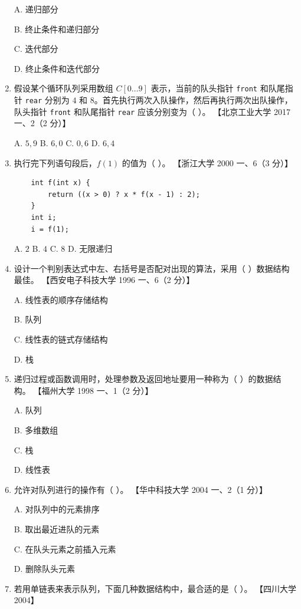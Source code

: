 \documentclass[lang=cn,newtx,10pt,scheme=chinese]{elegantbook}
\begin{document}
\begin{enumerate}
    A. 递归部分  

    B. 终止条件和递归部分  

    C. 迭代部分  

    D. 终止条件和迭代部分  

    \item 假设某个循环队列采用数组 $C[0 \ldots 9]$ 表示，当前的队头指针 \texttt{front} 和队尾指针 \texttt{rear} 分别为 $4$ 和 $8$。首先执行两次入队操作，然后再执行两次出队操作，队头指针 \texttt{front} 和队尾指针 \texttt{rear} 应该分别变为（ ）。  
    【北京工业大学 2017 一、2（2 分）】  

    A. $5, 9$ \quad B. $6, 0$ \quad C. $0, 6$ \quad D. $6, 4$  

    \item 执行完下列语句段后，$f(1)$ 的值为（ ）。  
    【浙江大学 2000 一、6（3 分）】  

    \begin{verbatim}
    int f(int x) {
        return ((x > 0) ? x * f(x - 1) : 2);
    }
    int i;
    i = f(1);
    \end{verbatim}

    A. $2$ \quad B. $4$ \quad C. $8$ \quad D. 无限递归  

    \item 设计一个判别表达式中左、右括号是否配对出现的算法，采用（ ）数据结构最佳。  
    【西安电子科技大学 1996 一、6（2 分）】  

    A. 线性表的顺序存储结构  

    B. 队列  


    C. 线性表的链式存储结构  

    D. 栈  

    \item 递归过程或函数调用时，处理参数及返回地址要用一种称为（ ）的数据结构。  
    【福州大学 1998 一、1（2 分）】  

    A. 队列  

    B. 多维数组  

    C. 栈  

    D. 线性表  

    \item 允许对队列进行的操作有（ ）。  
    【华中科技大学 2004 一、2（1 分）】  

    A. 对队列中的元素排序  

    B. 取出最近进队的元素  

    C. 在队头元素之前插入元素  

    D. 删除队头元素  

    \item 若用单链表来表示队列，下面几种数据结构中，最合适的是（ ）。  
    【四川大学 2004】  


\end{enumerate}
\end{document}
